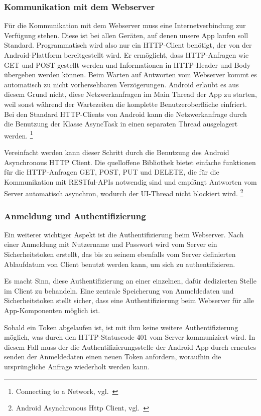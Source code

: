 \subsubsection{Kommunikation mit dem Webserver}
Für die Kommunikation mit dem Webserver muss eine Internetverbindung zur Verfügung stehen. Diese ist bei allen Geräten, auf denen unsere App laufen soll Standard. Programmatisch wird also nur ein HTTP-Client benötigt, der von der Android-Plattform bereitgestellt wird. Er ermöglicht, dass  HTTP-Anfragen wie GET und POST gestellt werden und Informationen in HTTP-Header und Body übergeben werden können. Beim Warten auf Antworten vom Webserver kommt es automatisch zu nicht vorhersehbaren Verzögerungen. Android erlaubt es aus diesem Grund nicht, diese Netzwerkanfragen im Main Thread der App zu starten, weil sonst während der Wartezeiten die komplette Benutzeroberfläche einfriert. Bei den Standard HTTP-Clients von Android kann die Netzwerkanfrage durch die Benutzung der Klasse AsyncTask in einen separaten Thread ausgelagert werden. \footnote{Connecting to a Network, vgl.~\cite{androidnetwork}}

Vereinfacht werden kann dieser Schritt durch die Benutzung des Android Asynchronous HTTP Client. Die quelloffene Bibliothek bietet einfache funktionen für die HTTP-Anfragen GET, POST, PUT und DELETE, die für die Kommunikation mit RESTful-APIs notwendig sind und empfängt Antworten vom Server automatisch asynchron, wodurch der UI-Thread nicht blockiert wird. \footnote{Android Asynchronous Http Client, vgl.~\cite{loopj}}
\subsubsection{Anmeldung und Authentifizierung}
Ein weiterer wichtiger Aspekt ist die Authentifizierung beim Webserver. Nach einer Anmeldung mit Nutzername und Passwort wird vom Server ein Sicherheitstoken erstellt, das bis zu seinem ebenfalls vom Server definierten Ablaufdatum von Client benutzt werden kann, um sich zu authentifizieren.

Es macht Sinn, diese Authentifizierung an einer einzelnen, dafür dedizierten Stelle im Client zu behandeln. Eine zentrale Speicherung von Anmeldedaten und Sicherheitstoken stellt sicher, dass eine Authentifizierung beim Webserver für alle App-Komponenten möglich ist.

Sobald ein Token abgelaufen ist, ist mit ihm keine weitere Authentifizierung möglich, was durch den HTTP-Statuscode 401 vom Server kommuniziert wird. In diesem Fall muss der die Authentifizierungsstelle der Android App durch erneutes senden der Anmeldedaten einen neuen Token anfordern, woraufhin die ursprüngliche Anfrage wiederholt werden kann.

